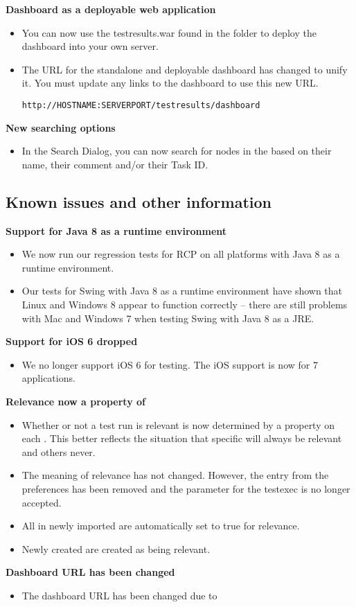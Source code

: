 \textbf{Dashboard as a deployable web application}
\begin{itemize}
\item You can now use the testresults.war found in the  folder to deploy the dashboard into your own server.
\item The URL for the standalone and deployable dashboard has changed to unify it. You must update any links to the dashboard to use this new URL.
\begin{verbatim}
http://HOSTNAME:SERVERPORT/testresults/dashboard
\end{verbatim}

\end{itemize}

\textbf{New searching options}
\begin{itemize}
\item In the Search Dialog, you can now search for nodes in the \gdproject{} based on their name, their comment and/or their Task ID.
\end{itemize}

\subsection{Known issues and other information}
\textbf{Support for Java 8 as a runtime environment}
\begin{itemize}
\item We now run our regression tests for RCP \gdauts{} on all platforms with Java 8 as a runtime environment.
\item Our tests for Swing with Java 8 as a runtime environment have shown that Linux and Windows 8 appear to function correctly -- there are still problems with Mac and Windows 7 when testing Swing \gdauts{} with Java 8 as a JRE.
\end{itemize}
\textbf{Support for iOS 6 dropped}
\begin{itemize}
\item We no longer support iOS 6 for testing. The iOS support is now for 7 applications. 
\end{itemize}

\textbf{Relevance now a property of \gdsuites{}}
\begin{itemize}
\item Whether or not a test run is relevant is now determined by a property on each \gdsuite{}. This better reflects the situation that specific \gdsuites{} will always be relevant and others never. 
\item The meaning of relevance has not changed. However, the entry from the preferences has been removed and the parameter for the testexec is no longer accepted. 
\item All \gdsuites{} in newly imported \gdprojects{} are automatically set to true for relevance.
\item Newly created \gdsuites{} are created as being relevant.
\end{itemize}

\textbf{Dashboard URL has been changed}
\begin{itemize}
\item The dashboard URL has been changed due to 
\end{itemize}
